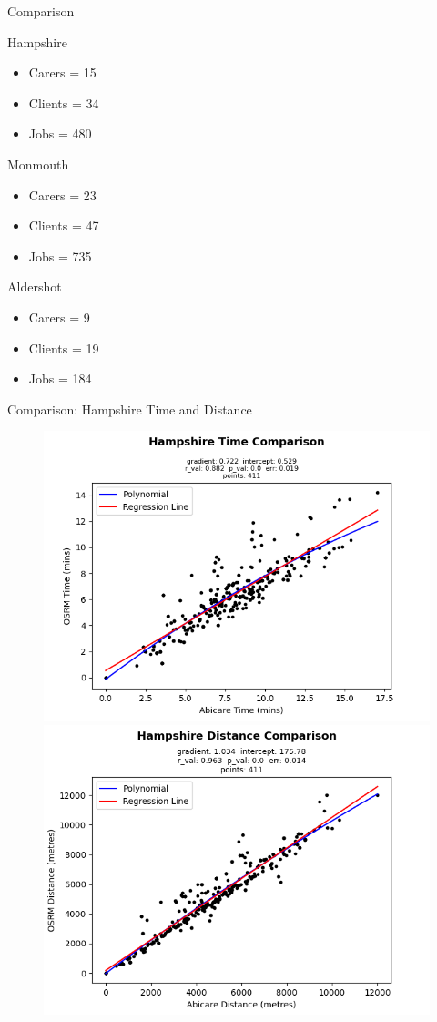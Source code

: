 \documentclass[usenames,dvipsnames]{beamer}
\begin{document}
\begin{frame}{Comparison}
\small
\begin{multicols}{3}	
\begin{block}{Hampshire}
	\begin{itemize}
		\item Carers = 15
		\item Clients = 34
		\item Jobs = 480
	\end{itemize}
\end{block}
\begin{block}{Monmouth}
	\begin{itemize}
		\item Carers = 23
		\item Clients = 47
		\item Jobs = 735
	\end{itemize}
\end{block}
\begin{block}{Aldershot}
	\begin{itemize}
		\item Carers = 9
		\item Clients = 19
		\item Jobs = 184
	\end{itemize}
\end{block}
\end{multicols}	
\end{frame}

\begin{frame}{Comparison: Hampshire Time and Distance}
	\begin{figure}
		\includegraphics[width=0.5\linewidth]{figures/Hampshire_time_comparison_abi}%
		\includegraphics[width=0.5\linewidth]{figures/Hampshire_dist_comparison_abi}
	\end{figure}
\end{frame}
\end{document}
